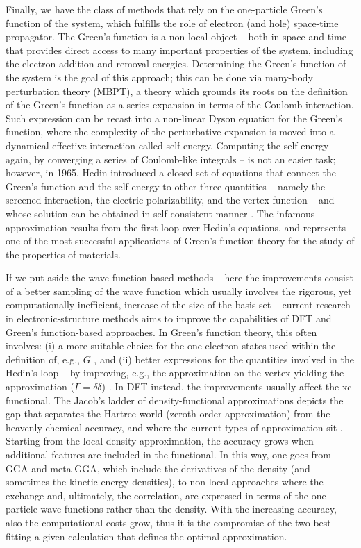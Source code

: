 Finally, we have the class of methods that rely on the one-particle Green's function of the system, which fulfills the role of electron (and hole) space-time propagator. The Green's function is a non-local object -- both in space and time -- that provides direct access to many important properties of the system, including the electron addition and removal energies. Determining the Green's function of the system is the goal of this approach; this can be done via many-body perturbation theory (MBPT), a theory which grounds its roots on the definition of the Green's function as a series expansion in terms of the Coulomb interaction. Such expression can be recast into a non-linear Dyson equation for the Green's function, where the complexity of the perturbative expansion is moved into a dynamical effective interaction called self-energy. Computing the self-energy -- again, by converging a series of Coulomb-like integrals -- is not an easier task; however, in 1965, Hedin introduced a closed set of equations that connect the Green's function and the self-energy to other three quantities -- namely the screened interaction, the electric polarizability, and the vertex function -- and whose solution can be obtained in self-consistent manner \cite{hedin_new_1965}. The infamous \gw approximation results from the first loop over Hedin's equations, and represents one of the most successful applications of Green's function theory for the study of the properties of materials.

If we put aside the wave function-based methods -- here the improvements consist of a better sampling of the wave function which usually involves the rigorous, yet computationally inefficient, increase of the size of the basis set -- current research in electronic-structure methods aims to improve the capabilities of DFT and Green's function-based approaches. In Green's function theory, this often involves: (i) a more suitable choice for the one-electron states used within the definition of, e.g., $G$ \cite{bruneval_benchmarking_2013}, and (ii) better expressions for the quantities involved in the Hedin's loop -- by improving, e.g., the approximation on the vertex yielding the \gw approximation ($\Gamma=\delta \delta$) \cite{chen_accurate_2015}. In DFT instead, the improvements usually affect the xc functional. The Jacob's ladder of density-functional approximations depicts the gap that separates the Hartree world (zeroth-order approximation) from the heavenly chemical accuracy, and where the current types of approximation sit \cite{perdew_jacobs_2001}. Starting from the local-density approximation, the accuracy grows when additional features are included in the functional. In this way, one goes from GGA and meta-GGA, which include the derivatives of the density (and sometimes the kinetic-energy densities), to non-local approaches where the exchange and, ultimately, the correlation, are expressed in terms of the one-particle wave functions rather than the density. With the increasing accuracy, also the computational costs grow, thus it is the compromise of the two best fitting a given calculation that defines the optimal approximation.


